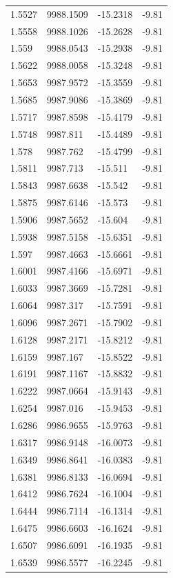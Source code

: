 \begin{table}[H]
\begin{tabular}{llll}
1.5527 & 9988.1509 & -15.2318 & -9.81 \\
1.5558 & 9988.1026 & -15.2628 & -9.81 \\
1.559 & 9988.0543 & -15.2938 & -9.81 \\
1.5622 & 9988.0058 & -15.3248 & -9.81 \\
1.5653 & 9987.9572 & -15.3559 & -9.81 \\
1.5685 & 9987.9086 & -15.3869 & -9.81 \\
1.5717 & 9987.8598 & -15.4179 & -9.81 \\
1.5748 & 9987.811 & -15.4489 & -9.81 \\
1.578 & 9987.762 & -15.4799 & -9.81 \\
1.5811 & 9987.713 & -15.511 & -9.81 \\
1.5843 & 9987.6638 & -15.542 & -9.81 \\
1.5875 & 9987.6146 & -15.573 & -9.81 \\
1.5906 & 9987.5652 & -15.604 & -9.81 \\
1.5938 & 9987.5158 & -15.6351 & -9.81 \\
1.597 & 9987.4663 & -15.6661 & -9.81 \\
1.6001 & 9987.4166 & -15.6971 & -9.81 \\
1.6033 & 9987.3669 & -15.7281 & -9.81 \\
1.6064 & 9987.317 & -15.7591 & -9.81 \\
1.6096 & 9987.2671 & -15.7902 & -9.81 \\
1.6128 & 9987.2171 & -15.8212 & -9.81 \\
1.6159 & 9987.167 & -15.8522 & -9.81 \\
1.6191 & 9987.1167 & -15.8832 & -9.81 \\
1.6222 & 9987.0664 & -15.9143 & -9.81 \\
1.6254 & 9987.016 & -15.9453 & -9.81 \\
1.6286 & 9986.9655 & -15.9763 & -9.81 \\
1.6317 & 9986.9148 & -16.0073 & -9.81 \\
1.6349 & 9986.8641 & -16.0383 & -9.81 \\
1.6381 & 9986.8133 & -16.0694 & -9.81 \\
1.6412 & 9986.7624 & -16.1004 & -9.81 \\
1.6444 & 9986.7114 & -16.1314 & -9.81 \\
1.6475 & 9986.6603 & -16.1624 & -9.81 \\
1.6507 & 9986.6091 & -16.1935 & -9.81 \\
1.6539 & 9986.5577 & -16.2245 & -9.81 \\

\end{tabular}
\end{table}
